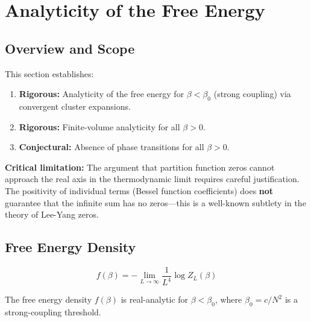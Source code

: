 \section{Analyticity of the Free Energy}
\label{sec:analyticity}

\subsection{Overview and Scope}

\begin{tcolorbox}[colback=yellow!5!white, colframe=yellow!75!black, title=\textbf{Honest Assessment of This Section}]
This section establishes:
\begin{enumerate}
    \item \textbf{Rigorous:} Analyticity of the free energy for $\beta < \beta_0$ (strong coupling) via convergent cluster expansions.
    \item \textbf{Rigorous:} Finite-volume analyticity for all $\beta > 0$.
    \item \textbf{Conjectural:} Absence of phase transitions for all $\beta > 0$.
\end{enumerate}

\textbf{Critical limitation:} The argument that partition function zeros cannot approach the real axis in the thermodynamic limit requires careful justification. The positivity of individual terms (Bessel function coefficients) does \textbf{not} guarantee that the infinite sum has no zeros---this is a well-known subtlety in the theory of Lee-Yang zeros.
\end{tcolorbox}

\subsection{Free Energy Density}

\begin{definition}
\[
f(\beta) = -\lim_{L \to \infty} \frac{1}{L^4} \log Z_L(\beta)
\]
\end{definition}

\begin{theorem}
\label{thm:analyticity}
The free energy density $f(\beta)$ is real-analytic for $\beta < \beta_0$, where $\beta_0 = c/N^2$ is a strong-coupling threshold.
\end{theorem}

